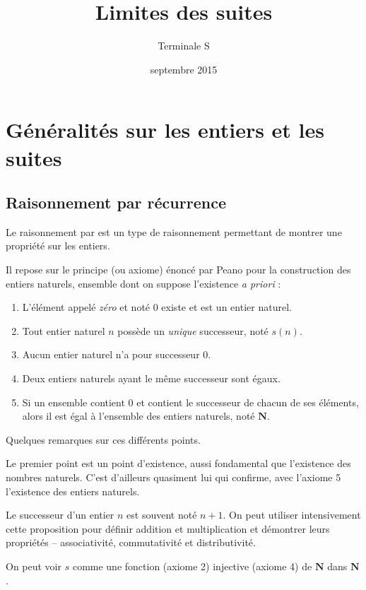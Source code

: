 \documentclass[12pt,a4paper]{article}
\title{Limites des suites}
\author{Terminale S}
\date{septembre 2015}
\makeatletter
\renewcommand{\maketitle}%
{\framebox{%
    \begin{minipage}{1.0\linewidth}%
      \begin{center}%
        \Large \@title ~-- \@author \\%
        \@date%
      \end{center}%
    \end{minipage}}%
  \normalsize%
}
\newcommand{\N}{\mathbf{N}}
\theoremstyle{break}
\theoremstyle{plain}
\theoremstyle{nonumberplain}
\theoremstyle{nonumberbreak}
\makeatother
\begin{document}
\maketitle

\section{Généralités sur les entiers et les suites}

\subsection{Raisonnement par récurrence}

Le raisonnement par \underline{\hspace{8em}} est un type de raisonnement
permettant de montrer une propriété sur les entiers.

Il repose sur le principe (ou axiome) énoncé par Peano pour la
construction des entiers naturels, ensemble dont on suppose l'existence
\emph{a priori} :
\begin{enumerate}[label=(\roman*)]
  \item L'élément appelé \emph{zéro} et noté 0 existe et est un entier
    naturel.
  \item Tout entier naturel $n$ possède un \emph{unique} successeur,
    noté $s(n)$.
  \item Aucun entier naturel n'a pour successeur 0.
  \item Deux entiers naturels ayant le même successeur sont égaux.
  \item Si un ensemble contient 0 et contient le successeur de chacun de
    ses éléments, alors il est égal à l'ensemble des entiers naturels,
    noté $\N$.
\end{enumerate}

Quelques remarques sur ces différents points.

Le premier point est un point d'existence, aussi fondamental que
l'existence des nombres naturels. C'est d'ailleurs quasiment lui qui
confirme, avec l'axiome 5 l'existence des entiers naturels.

Le successeur d'un entier $n$ est souvent noté $n+1$. On peut utiliser
intensivement cette proposition pour définir addition et multiplication
et démontrer leurs propriétés -- associativité, commutativité et
distributivité.

On peut voir $s$ comme une fonction (axiome 2) injective (axiome 4) de
$\N$ dans $\N$.
\end{document}
